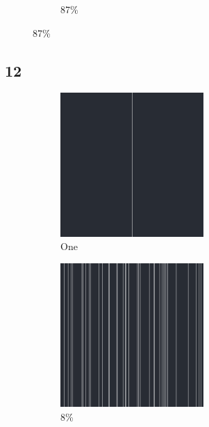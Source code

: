 \documentclass[12pt, fleqn]{report}                             %
\theoremstyle{break}                                            %
\begin{document}
\begin{figure}[ht!]
\begin{subfigure}[b]{0.4\linewidth}
          \caption{87\%}
        \end{subfigure}
      \end{figure}


      \clearpage
      \subsection{12}
      \begin{figure}[ht!]
        \centering
        \begin{subfigure}[b]{0.4\linewidth}
          \includegraphics[width=0.6\textwidth]{Images/12/a.png}
          \caption{One}
        \end{subfigure}
        \begin{subfigure}[b]{0.4\linewidth}
          \includegraphics[width=0.6\textwidth]{Images/12/b.png}
          \caption{8\%}
        \end{subfigure}
        \begin{subfigure}[b]{0.4\linewidth}

\end{subfigure}
\end{figure}
\end{document}

